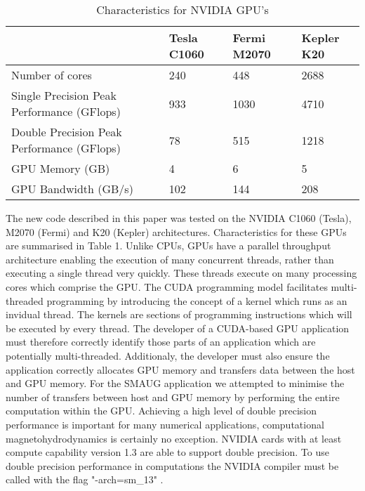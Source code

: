 \documentclass[final,1p]{elsarticle}
\begin{document}
\begin{table}
\begin{tabular}{ | l | l | l| l| }
\hline
   &  Tesla C1060 & Fermi M2070 & Kepler K20\\
\hline
  Number of cores & 240 & 448 & 2688\\
\hline
  Single Precision Peak Performance (GFlops) & 933 & 1030 & 4710 \\
\hline
 Double Precision Peak Performance (GFlops) & 78 & 515 & 1218\\
\hline
 GPU Memory (GB) & 4 & 6 & 5 \\
\hline
GPU Bandwidth (GB/s)  & 102 & 144 & 208 \\
\hline
\end{tabular} 
\caption{Characteristics for NVIDIA GPU's}
\end{table}

The new code described in this paper was tested on the NVIDIA C1060  (Tesla),  M2070 (Fermi)   and K20  (Kepler) architectures. Characteristics for these GPUs are summarised in Table 1. Unlike CPUs, GPUs have a parallel throughput architecture enabling the execution of many concurrent threads, rather than  executing a single thread very quickly. These threads execute on many processing cores which comprise the GPU. The CUDA programming model facilitates multi-threaded programming by introducing the concept of a kernel which runs as an invidual thread. The kernels are sections of programming instructions which will be executed by every thread.  The developer of a CUDA-based GPU application must therefore correctly identify those parts of an application which are potentially multi-threaded. Additionaly, the developer must also ensure the application correctly allocates GPU memory and transfers data between the host and GPU memory. For the SMAUG application we attempted to minimise the number of transfers between host and  GPU memory by performing the entire computation within the GPU. Achieving a high level of double precision performance is important for many numerical applications, computational magnetohydrodynamics is certainly no exception. NVIDIA cards with at least compute capability version 1.3 are able to support double precision. To use double precision performance in computations the NVIDIA compiler must be called with the flag "-arch=sm\_13"  \cite{Whitehead2011}.
\end{document}

